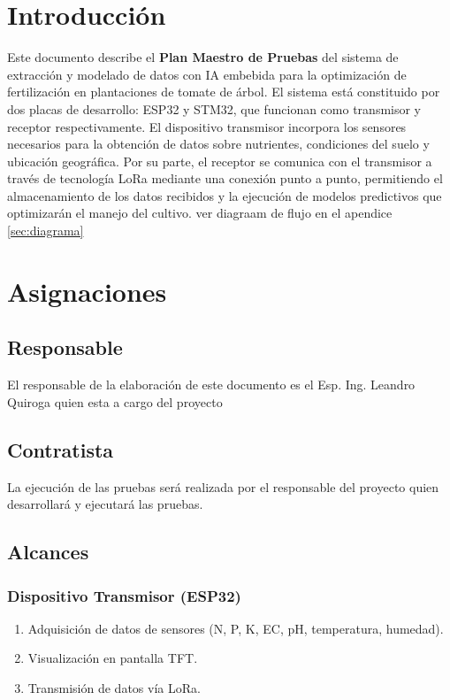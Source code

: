 \documentclass[12pt,a4paper, twosite]{article}
\begin{document}
\section{Introducción}
\label{sec:introduccion}
Este documento describe el \textbf{Plan Maestro de Pruebas} del sistema de extracción y modelado de datos con IA embebida para la optimización de fertilización en plantaciones de tomate de árbol.
El sistema está constituido por dos placas de desarrollo: ESP32 y STM32, que funcionan como transmisor y receptor respectivamente. El dispositivo transmisor 
incorpora los sensores necesarios para la obtención de datos sobre nutrientes, condiciones del suelo y ubicación geográfica. Por su parte, el receptor se comunica con el transmisor a través de tecnología LoRa mediante una conexión punto a punto, permitiendo el almacenamiento de los datos recibidos y la ejecución de modelos predictivos que optimizarán el manejo del cultivo.
ver diagraam de flujo en el apendice \ref{sec:diagrama}

\section{Asignaciones}
\label{sec:asignaciones}

\subsection{Responsable}
El responsable de la elaboración de este documento es el Esp. Ing. Leandro Quiroga quien esta a cargo del proyecto

\subsection{Contratista}
La ejecución de las pruebas será realizada por el responsable del proyecto quien desarrollará y ejecutará las pruebas.

\subsection{Alcances}

\subsubsection{Dispositivo Transmisor (ESP32)}

\begin{enumerate}
  \item Adquisición de datos de sensores (N, P, K, EC, pH, temperatura, humedad).
  \item Visualización en pantalla TFT.
  \item Transmisión de datos vía LoRa.
\end{enumerate}
\end{document}
